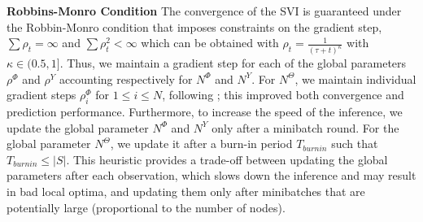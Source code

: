 \textbf{Robbins-Monro Condition} The convergence of the SVI is guaranteed under the Robbin-Monro condition \cite{robbins1951stochastic} that imposes constraints on the gradient step, $\sum \rho_t = \infty$ and $\sum \rho_t^2 < \infty$ which can be obtained with $\rho_t = \frac{1}{(\tau +t)^\kappa}$ with $\kappa \in (0.5, 1]$. Thus, we maintain a gradient step for each of the global parameters $\rho^\Phi$ and $\rho^Y$ accounting respectively for  $N^\Phi$ and $N^Y$. For $N^\Theta$, we maintain individual gradient steps $\rho_i^{\Phi}$ for $1\leq i\leq N$, following \cite{miller2009nonparametric}; this improved both convergence and prediction performance.%
Furthermore, to increase the speed of the inference, we update the global parameter $N^\Phi$ and $N^Y$ only after a minibatch round. For the global parameter $N^\Theta$, we update it after a burn-in period $T_{burnin}$ such that $T_{burnin} \leq |S|$.
This heuristic provides a trade-off between updating the global parameters after each observation, which slows down the inference and may result in bad local optima, and updating them only after minibatches that are potentially large (proportional to the number of nodes).


%
%

